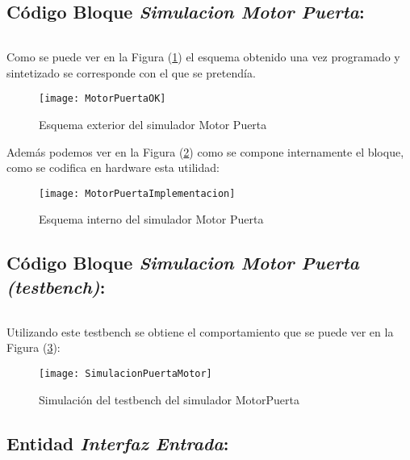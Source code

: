 \subsection{Código Bloque \textit{ Simulacion Motor Puerta}:} \label{code:MotorPuerta}
	\inputminted[frame=lines,fontsize=\footnotesize,linenos]{vhdl}{CodeFiles/EntidadInterfazEntrada.vhd}

	Como se puede ver en la Figura (\ref{fig:MotorPuertaOK}) el esquema obtenido una vez programado y sintetizado se corresponde con el que se pretendía.
    \begin{figure}[H]
		    \centering
		    \texttt{[image: MotorPuertaOK]}
		    \caption{Esquema exterior del simulador Motor Puerta}
		    \label{fig:MotorPuertaOK}
	\end{figure}
    Además podemos ver en la Figura (\ref{fig:MotorPuertaImplementacion}) como se compone internamente el bloque, como se codifica en hardware esta utilidad:
    \begin{figure}[H]
		    \centering
		    \texttt{[image: MotorPuertaImplementacion]}
		    \caption{Esquema interno del simulador Motor Puerta}
		    \label{fig:MotorPuertaImplementacion}
	\end{figure}
\subsection{Código Bloque \textit{Simulacion Motor Puerta (testbench)}:} \label{code:MotorPuerta_tb}
	\inputminted[frame=lines,fontsize=\footnotesize,linenos]{vhdl}{CodeFiles/EntidadInterfazEntrada_tb.vhd}

    Utilizando este testbench se obtiene el comportamiento que se puede ver en la Figura (\ref{fig:SimulacionMotorPuerta}):

    \begin{figure}[H]
		    \centering
		    \texttt{[image: SimulacionPuertaMotor]}
		    \caption{Simulación del testbench del simulador MotorPuerta}
		    \label{fig:SimulacionMotorPuerta}
	\end{figure}

\subsection{Entidad \textit{Interfaz Entrada}:} \label{code:InterfazEntrada}
	\inputminted[frame=lines,fontsize=\footnotesize,linenos]{vhdl}{CodeFiles/EntidadInterfazEntrada.vhd}

